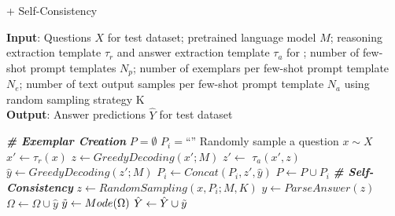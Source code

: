 \begin{algorithm}[h]
\caption{\oursvtwo + Self-Consistency}
\label{alg:algorithm_palm}
\textbf{Input}: 
Questions $X$ for test dataset; pretrained language model $M$; reasoning extraction template $\tau_{r}$ and answer extraction template $\tau_a$ for \ours; number of few-shot prompt templates $N_p$; number of exemplars per few-shot prompt template $N_e$; number of text output samples per few-shot prompt template $N_a$ using random sampling strategy K\\
\textbf{Output}: Answer predictions ${\hat{Y}}$ for test dataset
\begin{algorithmic}[1]
\STATE \textit{\textbf{\# Exemplar Creation}} 
\STATE $P = \emptyset$ 
\STATE $P_i = $``'' 
\STATE Randomly sample a question $x\sim X$
\STATE $x' \leftarrow \tau_r(x)$ 
\STATE $z\leftarrow GreedyDecoding(x'; M)$ 
\STATE $z'\leftarrow$ $\tau_a(x', z)$ 
\STATE $\hat{y} \leftarrow GreedyDecoding(z'; M)$ 
\STATE $P_i \leftarrow Concat(P_i, z', \hat{y})$ 
\ENDFOR
\STATE $P \leftarrow P \cup P_i$ 
\ENDFOR
\STATE
\STATE \textit{\textbf{\# Self-Consistency}} 
\STATE {$\Omega = \emptyset$}
\STATE {}
\STATE $z \leftarrow RandomSampling(x, P_i; M, K)$ 
\STATE {}
\STATE $\hat{y} \leftarrow ParseAnswer(z)$
\STATE $\Omega \leftarrow \Omega \cup \hat{y}$
\ENDFOR
\ENDFOR
\STATE $\Tilde{y} \leftarrow Mode(\Omega)$ 
\STATE $\hat{Y} \leftarrow \hat{Y} \cup \Tilde{y}$
\ENDFOR
\end{algorithmic}
\end{algorithm}